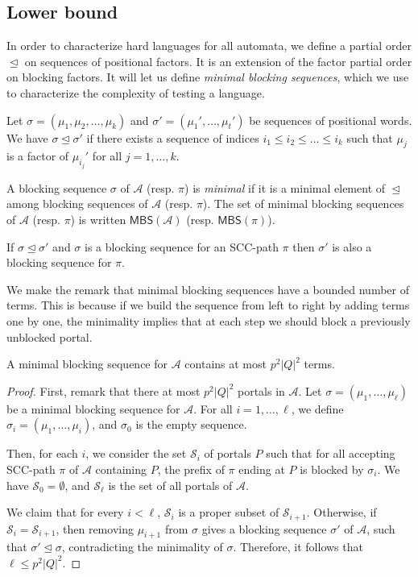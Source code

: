 \documentclass[letterpaper, USenglish, cleveref, autoref, thm-restate, numberwithinsect]{lipics-v2021}
\theoremstyle{theorem}
\theoremstyle{definition}
\newcommand{\Aa}{\mathcal{A}}
\newcommand{\MBS}{\textsf{MBS}\xspace}
\newcommand{\pobs}{\trianglelefteq}
\newcommand{\Ss}{\mathcal{S}}
\newcommand{\SCCpath}{\pi}
\begin{document}
\subsection{Lower bound}

In order to characterize hard languages for all automata, we define a partial order $\pobs$ on sequences of positional factors.
It is an extension of the factor partial order on blocking factors. 
It will let us define \emph{minimal blocking sequences}, which we use to characterize the complexity of testing a language. 

\begin{definition}\label{def:MBS}
	Let $\sigma = (\mu_1, \mu_2, \ldots, \mu_k)$ and $\sigma' =  (\mu_1',\ldots, \mu_{t}')$ be sequences of positional words.
	We have $\sigma \pobs \sigma'$ if there exists a sequence of indices $i_1 \leq i_2 \leq \ldots \leq i_k$ such that $\mu_{j}$ is a factor of $\mu_{i_j}'$ for all $j = 1,\ldots, k$.
	
	A blocking sequence $\sigma$ of $\Aa$ (resp. $\SCCpath$) is \emph{minimal} if it is a minimal element of $\pobs$ among blocking sequences of $\Aa$ (resp. $\SCCpath$). The set of minimal blocking sequences of $\Aa$ (resp. $\SCCpath$) is written $\MBS(\Aa)$ (resp. $\MBS(\SCCpath)$).
\end{definition}

\begin{remark}
	If $\sigma \pobs \sigma'$ and $\sigma$ is a blocking sequence for an SCC-path $\pi$ then $\sigma'$ is also a blocking sequence for $\pi$.
\end{remark}

We make the remark that minimal blocking sequences have a bounded number of terms. This is because if we build the sequence from left to right by adding terms one by one, the minimality implies that at each step we should block a previously unblocked portal.
\begin{lemma}
    \label{lem:bound-length-min-blocking}
    A minimal blocking sequence for $\Aa$ contains at most $p^2|Q|^2$ terms.
\end{lemma}
\begin{proof}
    First, remark that there at most $p^2|Q|^2$ portals in $\Aa$.
    Let $\sigma = (\mu_1, \ldots, \mu_\ell)$ be a minimal blocking sequence for $\Aa$.
    For all $i = 1,\ldots, \ell$, we define $\sigma_i = (\mu_1, \ldots, \mu_i)$, and $\sigma_0$ is the empty sequence.
    
    Then, for each $i$, we consider the set $\Ss_i$ of portals $P$ such that for all accepting SCC-path $\SCCpath$ of $\Aa$ containing $P$, the prefix of $\SCCpath$ ending at $P$ is blocked by $\sigma_i$.
    We have $\Ss_0 = \emptyset$, and $\Ss_\ell$ is the set of all portals of $\Aa$.
    
    We claim that for every $i <\ell$, $\Ss_i$ is a proper subset of $\Ss_{i+1}$.
    Otherwise, if $\Ss_i = \Ss_{i+1}$, then removing $\mu_{i+1}$ from $\sigma$ gives a blocking sequence $\sigma'$ of $\Aa$, such that $\sigma'\pobs \sigma$, contradicting the minimality of $\sigma$.
    Therefore, it follows that $\ell \le p^2|Q|^2$.
\end{proof}
\end{document}
